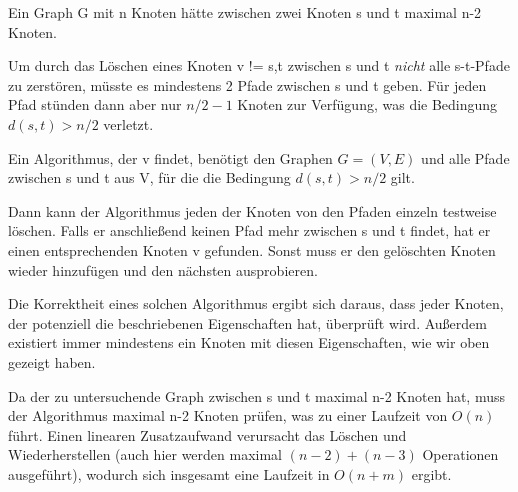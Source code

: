 Ein Graph G mit n Knoten hätte zwischen zwei Knoten s und t maximal n-2 Knoten. 

Um durch das Löschen eines Knoten v != s,t zwischen s und t \textit{nicht} alle s-t-Pfade zu zerstören, müsste es mindestens 2 Pfade zwischen s und t geben. Für jeden Pfad stünden dann aber nur $n/2 - 1$ Knoten zur Verfügung, was die Bedingung $d(s,t) > n/2$ verletzt.

\begin{tabbing}
\end{tabbing}

Ein Algorithmus, der v findet, benötigt den Graphen $G=(V, E)$ und alle Pfade zwischen s und t aus V, für die die Bedingung $d(s,t) > n/2$ gilt.

Dann kann der Algorithmus jeden der Knoten von den Pfaden einzeln testweise löschen. Falls er anschließend keinen Pfad mehr zwischen s und t findet, hat er einen entsprechenden Knoten v gefunden. Sonst muss er den gelöschten Knoten wieder hinzufügen und den nächsten ausprobieren.

Die Korrektheit eines solchen Algorithmus ergibt sich daraus, dass jeder Knoten, der potenziell die beschriebenen Eigenschaften hat, überprüft wird. Außerdem existiert immer mindestens ein Knoten mit diesen Eigenschaften, wie wir oben gezeigt haben.

Da der zu untersuchende Graph zwischen s und t maximal n-2 Knoten hat, muss der Algorithmus maximal n-2 Knoten prüfen, was zu einer Laufzeit von $O(n)$ führt. Einen linearen Zusatzaufwand verursacht das Löschen und Wiederherstellen (auch hier werden maximal $(n-2)+(n-3)$ Operationen ausgeführt), wodurch sich insgesamt eine Laufzeit in $O(n+m)$ ergibt.